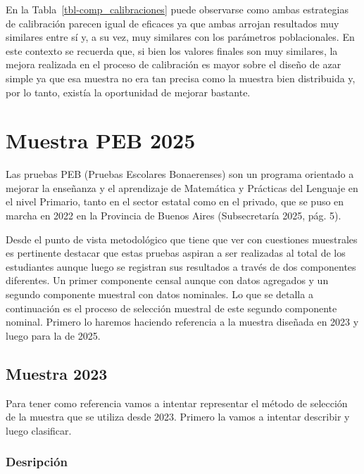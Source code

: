 \documentclass[
  spanish,
  a4paper,
]{scrreprt}
\begin{document}
\begin{table}
{}

\end{table}%

En la Tabla~\ref{tbl-comp_calibraciones} puede observarse como ambas
estrategias de calibración parecen igual de eficaces ya que ambas
arrojan resultados muy similares entre sí y, a su vez, muy similares con
los parámetros poblacionales. En este contexto se recuerda que, si bien
los valores finales son muy similares, la mejora realizada en el proceso
de calibración es mayor sobre el diseño de azar simple ya que esa
muestra no era tan precisa como la muestra bien distribuida y, por lo
tanto, existía la oportunidad de mejorar bastante.


\chapter{Muestra PEB 2025}\label{muestra-peb-2025}

\noindent Las pruebas PEB (Pruebas Escolares Bonaerenses) son un
programa orientado a mejorar la enseñanza y el aprendizaje de Matemática
y Prácticas del Lenguaje en el nivel Primario, tanto en el sector
estatal como en el privado, que se puso en marcha en 2022 en la
Provincia de Buenos Aires ({Subsecretaría} 2025, pág. 5).

Desde el punto de vista metodológico que tiene que ver con cuestiones
muestrales es pertinente destacar que estas pruebas aspiran a ser
realizadas al total de los estudiantes aunque luego se registran sus
resultados a través de dos componentes diferentes. Un primer componente
censal aunque con datos agregados y un segundo componente muestral con
datos nominales. Lo que se detalla a continuación es el proceso de
selección muestral de este segundo componente nominal. Primero lo
haremos haciendo referencia a la muestra diseñada en 2023 y luego para
la de 2025.

\section{Muestra 2023}\label{muestra-2023}

Para tener como referencia vamos a intentar representar el método de
selección de la muestra que se utiliza desde 2023. Primero la vamos a
intentar describir y luego clasificar.

\subsection{Desripción}\label{desripciuxf3n}
\end{document}
